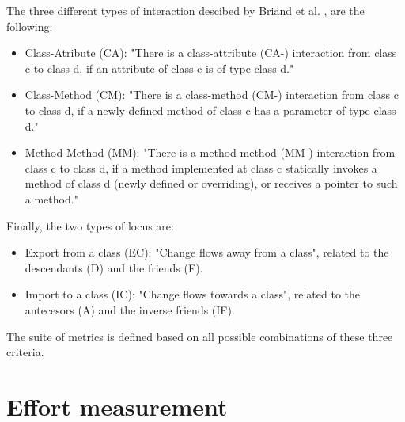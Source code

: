 \blankls
The three different types of interaction descibed by Briand et al. \cite{briand1997investigation}, are the following:
\begin{itemize}
    \item Class-Atribute (CA): "There is a class-attribute (CA-) interaction from class c to class d, if an attribute of class c is of type class d."
    \item Class-Method (CM): "There is a class-method (CM-) interaction from class c to class d, if a newly defined method of class c has a parameter of type class d."
    \item Method-Method (MM): "There is a method-method (MM-) interaction from class c to class d, if a method implemented at class c statically invokes a method of class d (newly defined or overriding), or receives a pointer to such a method."
\end{itemize}

\blankls
Finally, the two types of locus are:
\begin{itemize}
  \item Export from a class (EC): "Change flows away from a class", related to the descendants (D) and the friends (F).
  \item Import to a class (IC): "Change flows towards a class", related to the antecesors (A) and the inverse friends (IF).
\end{itemize}

\blankls
The suite of metrics is defined based on all possible combinations of these three criteria.

\section{Effort measurement}
